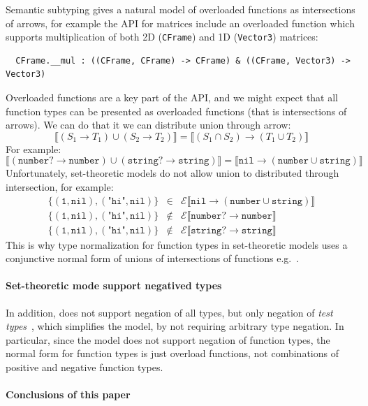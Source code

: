 \documentclass[acmsmall,review,screen]{acmart}
\newcommand{\NIL}{\mathtt{nil}}
\newcommand{\NUMBER}{\mathtt{number}}
\newcommand{\STRING}{\mathtt{string}}
\newcommand{\fun}{\mathbin{\rightarrow}}
\newcommand{\sem}[1]{\llbracket{#1}\rrbracket}
\begin{document}
  Semantic subtyping gives a natural model of overloaded functions as intersections of arrows,
  for example the  API for matrices include an overloaded function
  which supports multiplication of both 2D (\verb|CFrame|) and 1D (\verb|Vector3|) matrices:
\begin{verbatim}
  CFrame.__mul : ((CFrame, CFrame) -> CFrame) & ((CFrame, Vector3) -> Vector3)
\end{verbatim}
  Overloaded functions are a key part of the  API, and we might expect that
  all function types can be presented as overloaded functions (that is intersections of arrows). We can do 
  that it we can distribute union through arrow:
  \[
    \sem{(S_1 \fun T_1) \cup (S_2 \fun T_2)}
    =
    \sem{(S_1 \cap S_2) \fun (T_1 \cup T_2)}
  \]
  For example:
  \[
    \sem{(\NUMBER? \fun \NUMBER) \cup (\STRING? \fun \STRING)}
    =
    \sem{\NIL \fun (\NUMBER \cup \STRING)}
  \]
  Unfortunately, set-theoretic models do not allow union to distributed through intersection,
  for example:
  \[\begin{array}{rcl}
    \{ (\texttt{1}, \NIL), (\texttt{"hi"}, \NIL) \} & \in & \mathcal{E}\sem{\NIL \fun (\NUMBER \cup \STRING)} \\
    \{ (\texttt{1}, \NIL), (\texttt{"hi"}, \NIL) \} & \not\in & \mathcal{E}\sem{\NUMBER? \fun \NUMBER} \\
    \{ (\texttt{1}, \NIL), (\texttt{"hi"}, \NIL) \} & \not\in & \mathcal{E}\sem{\STRING? \fun \STRING}
  \end{array}\]
  This is why type normalization for function types in set-theoretic models
  uses a conjunctive normal form of unions of intersections of functions e.g.~\cite[\S4.1.2]{Ken21:DownDirty}.

\paragraph{Set-theoretic mode support negatived types}
  
In addition,  does not support negation of all types, but
only negation of \emph{test types}~\cite{CLNL22:OnTypeCases}, which
simplifies the model, by not requiring arbitrary type negation.  In
particular, since the model does not support negation of function
types, the normal form for function types is just overload functions,
not combinations of positive and negative function types.

\paragraph{Conclusions of this paper}
\end{document}

